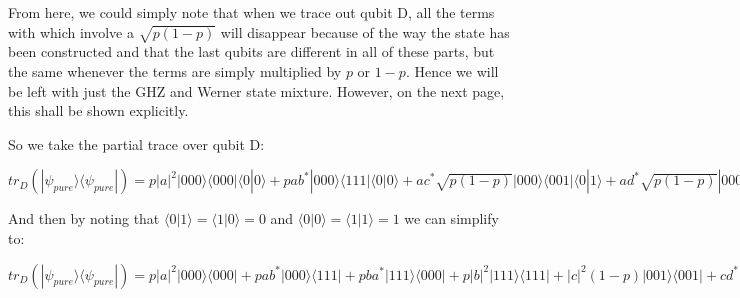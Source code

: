 \documentclass[12pt,a4paper]{article}
\numberwithin{equation}{section}
\begin{document}
\vskip 5mm

From here, we could simply note that when we trace out qubit D, all the terms with which involve a $\sqrt{p(1-p)}$ will disappear because of the way the state has been constructed and that the last qubits are different in all of these parts, but the same whenever the terms are simply multiplied by $p$ or $1-p$. Hence we will be left with just the GHZ and Werner state mixture. However, on the next page, this shall be shown explicitly.

\newpage

So we take the partial trace over qubit D:

\vskip 5mm

$tr_D(|\psi_{pure}\rangle\langle\psi_{pure}|) = p|a|^2|000\rangle\langle000|\langle0|0\rangle + pab^*|000\rangle\langle111|\langle0|0\rangle + ac^*\sqrt{p(1-p)}|000\rangle\langle001|\langle0|1\rangle + ad^*\sqrt{p(1-p)}|000\rangle\langle010|\langle0|1\rangle + af^*\sqrt{p(1-p)}|000\rangle\langle100|\langle0|1\rangle + pba^*|111\rangle\langle000|\langle0|0\rangle + p|b|^2|111\rangle\langle111|\langle0|0\rangle + bc^*\sqrt{p(1-p)}|111\rangle\langle001|\langle0|1\rangle + bd^*\sqrt{p(1-p)}|111\rangle\langle010|\langle0|1\rangle + bf^*\sqrt{p(1-p)}|111\rangle\langle100|\langle0|1\rangle + ca^*\sqrt{p(1-p)}|001\rangle\langle000|\langle1|0\rangle + cb^*\sqrt{p(1-p)}|001\rangle\langle111|\langle1|0\rangle + |c|^2(1-p)|001\rangle\langle001|\langle1|1\rangle + cd^*(1-p)|001\rangle\langle010|\langle1|1\rangle + cf^*(1-p)|001\rangle\langle100|\langle1|1\rangle + da^*\sqrt{p(1-p)}|010\rangle\langle000|\langle1|0\rangle + db^*\sqrt{p(1-p)}|010\rangle\langle111|\langle1|0\rangle + dc^*(1-p)|010\rangle\langle001|\langle1|1\rangle + |d|^2(1-p)|010\rangle\langle010|\langle1|1\rangle + df^*(1-p)|010\rangle\langle100|\langle1|1\rangle + fa^*\sqrt{p(1-p)}|100\rangle\langle000|\langle1|0\rangle + fb^*\sqrt{p(1-p)}|100\rangle\langle111|\langle1|0\rangle + fc^*(1-p)|100\rangle\langle001|\langle1|1\rangle + fd^*(1-p)|100\rangle\langle010|\langle1|1\rangle + |f|^2(1-p)|100\rangle\langle100|\langle1|1\rangle$

\vskip 5mm

And then by noting that $\langle0|1\rangle = \langle1|0\rangle = 0$ and $\langle0|0\rangle = \langle1|1\rangle = 1$ we can simplify to:

\vskip 5mm

$tr_D(|\psi_{pure}\rangle\langle\psi_{pure}|) =
p|a|^2|000\rangle\langle000| + pab^*|000\rangle\langle111| + pba^*|111\rangle\langle000| + p|b|^2|111\rangle\langle111| + |c|^2(1-p)|001\rangle\langle001| + cd^*(1-p)|001\rangle\langle010| + cf^*(1-p)|001\rangle\langle100| + dc^*(1-p)|010\rangle\langle001| + |d|^2(1-p)|010\rangle\langle010| + df^*(1-p)|010\rangle\langle100| + fc^*(1-p)|100\rangle\langle001| + fd^*(1-p)|100\rangle\langle010| + |f|^2(1-p)|100\rangle\langle100|$
\end{document}
